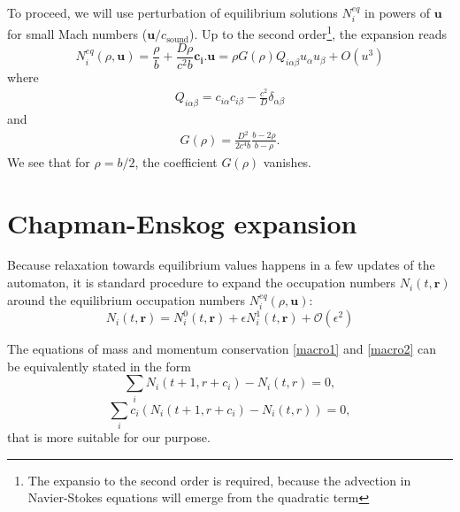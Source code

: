 To proceed, we will use perturbation of equilibrium solutions $N_i^{eq}$ in powers of $\bm{u}$ for small Mach numbers ($\bm{u}/c_{\mathrm{sound}}$). 
Up to the second order\footnote{The expansio to the second order is required, because the advection in Navier-Stokes equations will emerge from the quadratic term}, the expansion reads \cite{frisch}
\begin{equation} \label{eou}
N_i^{eq}(\rho,\bm{u}) = \frac{\rho}{b} + \frac{D\rho}{c^2 b}\bm{c_i}.\bm{u} = \rho G(\rho) Q_{i\alpha\beta}u_{\alpha}u_{\beta} + O(u^3)
\end{equation}
where 
\begin{align}
Q_{i\alpha\beta} = c_{i\alpha} c_{i\beta} - \frac{c^2}{D} \delta_{\alpha\beta}
\end{align}
and
\begin{align}
G(\rho) = \frac{D^2}{2c^4b}\frac{b-2\rho}{b-\rho}.
\end{align}
We see that for $\rho= b/2$, the coefficient $G(\rho)$ vanishes.

\section{Chapman-Enskog expansion}
Because relaxation towards equilibrium values happens in a few updates of the automaton, it is standard procedure to expand the occupation numbers $N_i(t,\bm{r})$ around the equilibrium occupation numbers $N_i^{eq}(\rho,\bm{u})$:
\begin{equation} \label{chap}
N_i(t,\bm{r}) = N_i^0(t,\bm{r}) + \epsilon N_i^1(t,\bm{r}) + \mathcal{O}(\epsilon^2) 
\end{equation} 


The equations of mass and momentum conservation \ref{macro1} and \ref{macro2} can be equivalently stated in the form
\begin{equation} \label{macro_m}
\sum_i N_i(t+1,r+c_i) - N_i(t,r) = 0 ,
\end{equation}
\begin{equation} \label{macro_p}
\sum_i c_i (N_i(t+1,r+c_i) - N_i(t,r)) = 0,
\end{equation}
that is more suitable for our purpose.

